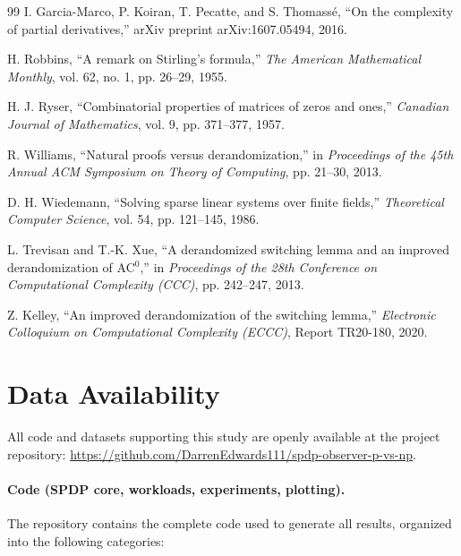 \documentclass[12pt]{article}
\theoremstyle{definition}
\theoremstyle{definition}
\theoremstyle{remark}
\theoremstyle{remark}
\begin{document}
\begin{thebibliography}{99}
I. Garcia-Marco, P. Koiran, T. Pecatte, and S. Thomassé, ``On the complexity of partial derivatives,'' arXiv preprint arXiv:1607.05494, 2016.

H. Robbins, ``A remark on Stirling's formula,'' \emph{The American Mathematical Monthly}, vol. 62, no. 1, pp. 26--29, 1955.

H. J. Ryser, ``Combinatorial properties of matrices of zeros and ones,'' \emph{Canadian Journal of Mathematics}, vol. 9, pp. 371--377, 1957.

R. Williams, ``Natural proofs versus derandomization,'' in \emph{Proceedings of the 45th Annual ACM Symposium on Theory of Computing}, pp. 21--30, 2013.

D. H. Wiedemann, ``Solving sparse linear systems over finite fields,'' \emph{Theoretical Computer Science}, vol. 54, pp. 121--145, 1986.

L. Trevisan and T.-K. Xue, ``A derandomized switching lemma and an improved derandomization of AC$^0$,'' in \emph{Proceedings of the 28th Conference on Computational Complexity (CCC)}, pp. 242--247, 2013.

Z. Kelley, ``An improved derandomization of the switching lemma,'' \emph{Electronic Colloquium on Computational Complexity (ECCC)}, Report TR20-180, 2020.

\end{thebibliography}


\appendix

\section*{Data Availability}

All code and datasets supporting this study are openly available at the project repository: \url{https://github.com/DarrenEdwards111/spdp-observer-p-vs-np}.

\paragraph{Code (SPDP core, workloads, experiments, plotting).}
The repository contains the complete code used to generate all results, organized into the following categories:
\end{document}
